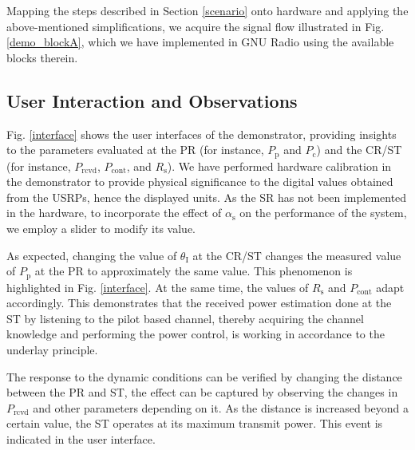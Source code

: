 Mapping the steps described in Section \ref{scenario} onto hardware and applying the above-mentioned simplifications, we acquire the signal flow illustrated in Fig. \ref{demo_blockA}, which we have implemented in GNU Radio using the available blocks therein.


\subsection{User Interaction and Observations}

Fig. \ref{interface} shows the user interfaces of the demonstrator, providing insights to the parameters evaluated at the PR (for instance, $P_\textrm{p}$ and $P_\textrm{c}$) and the CR/ST (for instance, $P_\textrm{rcvd}$, $P_\textrm{cont}$, and $R_\textrm{s}$). We have performed hardware calibration in the demonstrator to provide physical significance to the digital values obtained from the USRPs, hence the displayed units. As the SR has not been implemented in the hardware, to incorporate the effect of $\alpha_\textrm{s}$ on the performance of the system, we employ a slider to modify its value. %

As expected, changing the value of $\theta_\textrm{I}$ at the CR/ST changes the measured value of $P_\textrm{p}$ at the PR to approximately the same value. This phenomenon is highlighted in Fig. \ref{interface}. At the same time, the values of $R_\textrm{s}$ and $P_\textrm{cont}$ adapt accordingly. This demonstrates that the received power estimation done at the ST by listening to the pilot based channel, thereby acquiring the channel knowledge and performing the power control, is working in accordance to the underlay principle. 

The response to the dynamic conditions can be verified by changing the distance between the PR and ST, the effect can be captured by observing the changes in $P_\textrm{rcvd}$ and other parameters depending on it. As the distance is increased beyond a certain value, the ST operates at its maximum transmit power. This event is indicated in the user interface.

